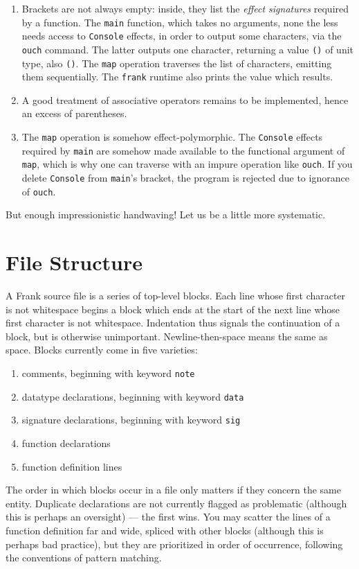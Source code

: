 \documentclass{article}
\begin{document}
\begin{enumerate}
\item Brackets are not always empty: inside, they list the \emph{effect signatures} required by a function. The \texttt{main} function, which takes no arguments, none the less needs access to \texttt{Console} effects, in order to output some characters, via the \texttt{ouch} command. The latter outputs one character, returning a value \texttt{()} of unit type, also  \texttt{()}. The \texttt{map} operation traverses the list of characters, emitting them sequentially. The \texttt{frank} runtime also prints the value which results.
\item A good treatment of associative operators remains to be implemented, hence an excess of parentheses.
\item The \texttt{map} operation is somehow effect-polymorphic. The \texttt{Console} effects required by \texttt{main} are somehow made available to the functional argument of \texttt{map}, which is why one can traverse with an impure operation like \texttt{ouch}. If you delete \texttt{Console} from \texttt{main}'s bracket, the program is rejected
due to ignorance of \texttt{ouch}.
\end{enumerate}

But enough impressionistic handwaving! Let us be a little more systematic.


\section{File Structure}

A Frank source file is a series of top-level blocks. Each line whose first character is not whitespace begins a block
which ends at the start of the next line whose first character is not whitespace. Indentation thus signals the continuation of a block, but is
otherwise unimportant. Newline-then-space means the same as space.
Blocks currently come in five varieties:
\begin{enumerate}
\item comments, beginning with keyword \texttt{note}
\item datatype declarations, beginning with keyword \texttt{data}
\item signature declarations, beginning with keyword \texttt{sig}
\item function declarations
\item function definition lines
\end{enumerate}

The order in which blocks occur in a file only matters if they concern the same entity. Duplicate declarations are not currently flagged as problematic (although this is perhaps an oversight) --- the first wins. You may scatter the lines of a function definition far and wide, spliced with other blocks (although this is perhaps bad practice), but they are prioritized in order of occurrence, following the conventions of pattern matching.
\end{document}
